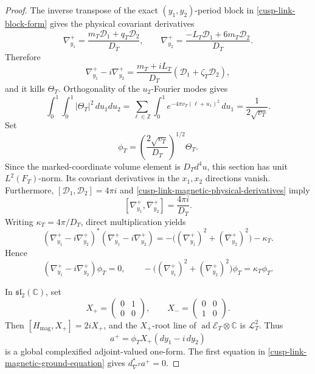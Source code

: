 \documentclass[11pt]{article}
\theoremstyle{definition}
\numberwithin{equation}{section}
\begin{document}
\begin{proof}
The inverse transpose of the exact \((y_1,y_2)\)-period block in
\eqref{cusp-link-block-form} gives the physical covariant derivatives
\begin{equation}
 \nabla_{y_1}^+
 =\frac{m_T\mathcal D_1+q_T\mathcal D_2}{D_T},
 \qquad
 \nabla_{y_2}^+
 =\frac{-L_T\mathcal D_1+6m_T\mathcal D_2}{D_T}.
 \label{cusp-link-magnetic-physical-derivatives}
\end{equation}
Therefore
\begin{equation}
 \nabla_{y_1}^+-i\nabla_{y_2}^+
 =\frac{m_T+iL_T}{D_T}
  (\mathcal D_1+\zeta_T\mathcal D_2),
 \label{cusp-link-magnetic-physical-annihilator}
\end{equation}
and it kills \(\Theta_T\).  Orthogonality of the \(u_2\)-Fourier modes gives
\[
 \int_0^1\!\int_0^1|\Theta_T|^2\,du_1du_2
 =\sum_{\ell\in\mathbb Z}\int_0^1
   e^{-4\pi v_T(\ell+u_1)^2}\,du_1
 =\frac1{2\sqrt{v_T}}.
\]
Set
\begin{equation}
 \phi_T=\left(\frac{2\sqrt{v_T}}{D_T}\right)^{1/2}\Theta_T.
 \label{cusp-link-magnetic-normalized-theta}
\end{equation}
Since the marked-coordinate volume element is \(D_Td^4u\), this section has
unit \(L^2(F_T)\)-norm.  Its covariant derivatives in the \(x_1,x_2\)
directions vanish.  Furthermore,
\([\mathcal D_1,\mathcal D_2]=4\pi i\) and
\eqref{cusp-link-magnetic-physical-derivatives} imply
\[
 [\nabla_{y_1}^+,\nabla_{y_2}^+]=\frac{4\pi i}{D_T}.
\]
Writing \(\kappa_T=4\pi/D_T\), direct multiplication yields
\[
 (\nabla_{y_1}^+-i\nabla_{y_2}^+)^*
 (\nabla_{y_1}^+-i\nabla_{y_2}^+)
 =-\bigl((\nabla_{y_1}^+)^2+(\nabla_{y_2}^+)^2\bigr)-\kappa_T.
\]
Hence
\begin{equation}
 (\nabla_{y_1}^+-i\nabla_{y_2}^+)\phi_T=0,
 \qquad
 -\bigl((\nabla_{y_1}^+)^2+(\nabla_{y_2}^+)^2\bigr)\phi_T
 =\kappa_T\phi_T.
 \label{cusp-link-magnetic-ground-equation}
\end{equation}

In \(\mathfrak{sl}_2(\mathbb C)\), set
\[
 X_+=\begin{pmatrix}0&1\\0&0\end{pmatrix},
 \qquad
 X_-=\begin{pmatrix}0&0\\1&0\end{pmatrix}.
\]
Then \([H_{\mathrm{mag}},X_+]=2iX_+\), and the \(X_+\)-root line of
\(\operatorname{ad}\mathscr E_T\otimes\mathbb C\) is
\(\mathscr L_T^2\).  Thus
\[
 a^+=\phi_TX_+(dy_1-i\,dy_2)
\]
is a global complexified adjoint-valued one-form.  The first equation in
\eqref{cusp-link-magnetic-ground-equation} gives
\(d_{\nabla^T}^*a^+=0\).


\end{proof}
\end{document}
